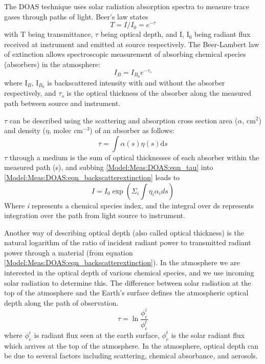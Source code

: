     The DOAS technique uses solar radiation absorption spectra to measure trace gases through paths of light.
    Beer's law states
    \begin{equation} \label{Model:Meas:DOAS:eqn_beerslaw}
    T = I/I_0 = e^{-\tau}
    \end{equation}
    with T being transmittance, $\tau$ being optical depth, and I, I$_0$ being radiant flux received at instrument and emitted at source respectively.
    The Beer-Lambert law of extinction allows spectroscopic measurement of absorbing chemical species (absorbers) in the atmosphere:
    \begin{equation} \label{Model:Meas:DOAS:eqn_backscatterextinction}
    I_B = I_{B_0} e^{-\tau_s}
    \end{equation}
    where I$_B$, I$_{B_0}$ is backscattered intensity with and without the absorber respectively, and $\tau_s$ is the optical thickness of the absorber along the measured path between source and instrument.
    
    $\tau$ can be described using the scattering and absorption cross section area ($\alpha$, cm$^{2}$) and density ($\eta$, molec cm$^{-3}$) of an absorber as follows:
    \begin{equation} \label{Model:Meas:DOAS:eqn_tau}
    \tau = \int \alpha(s) \eta(s) \mathrm{d}s
    \end{equation}
    $\tau$ through a medium is the sum of optical thicknesses of each absorber within the measured path (s), and subbing \ref{Model:Meas:DOAS:eqn_tau} into \ref{Model:Meas:DOAS:eqn_backscatterextinction} leads to
    \begin{equation*}
    I = I_0 \exp { \left( \Sigma_i \int \eta_i \alpha_i ds \right) }
    \end{equation*}
    Where \textit{i} represents a chemical species index, and the integral over ds represents integration over the path from light source to instrument.
    
    Another way of describing optical depth (also called optical thickness) is the natural logarithm of the ratio of incident radiant power to transmitted radiant power through a material (from equation \ref{Model:Meas:DOAS:eqn_backscatterextinction}).
    In the atmosphere we are interested in the optical depth of various chemical species, and we use incoming solar radiation to determine this.
    The difference between solar radiation at the top of the atmosphere and the Earth's surface defines the atmospheric optical depth along the path of observation.
    \begin{equation*}
    \tau = \ln{\frac{\phi_e^i}{\phi_e^t}}
    \end{equation*}
    where $\phi_e^i$ is radiant flux seen at the earth surface, $\phi_e^t$ is the solar radiant flux which arrives at the top of the atmosphere.
    In the atmosphere, optical depth can be due to several factors including scattering, chemical absorbance, and aerosols.
  
